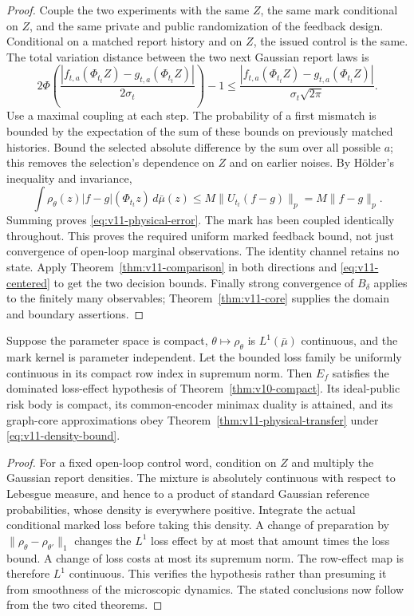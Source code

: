\begin{proof}
Couple the two experiments with the same $Z$, the same mark conditional
on $Z$, and the same private and public randomization of the feedback
design. Conditional on a matched report history and on $Z$, the issued
control is the same. The total variation distance between the two next
Gaussian report laws is
\[
 2\Phi\!\left(\frac{|f_{t,a}(\Phi_{t_t}Z)
                       -g_{t,a}(\Phi_{t_t}Z)|}{2\sigma_t}\right)-1
 \le \frac{|f_{t,a}(\Phi_{t_t}Z)
                       -g_{t,a}(\Phi_{t_t}Z)|}{\sigma_t\sqrt{2\pi}}.
\]
Use a maximal coupling at each step. The probability of a first mismatch
is bounded by the expectation of the sum of these bounds on previously
matched histories. Bound the selected absolute difference by the sum
over all possible $a$; this removes the selection's dependence on $Z$
and on earlier noises. By H\"older's inequality and invariance,
\[
 \int \rho_\theta(z)|f-g|(\Phi_{t_t}z)\,d\bar\mu(z)
 \le M\|U_{t_t}(f-g)\|_p=M\|f-g\|_p.
\]
Summing proves \eqref{eq:v11-physical-error}. The mark has been coupled
identically throughout. This proves the required uniform marked feedback
bound, not just convergence of open-loop marginal observations.
The identity channel retains no state. Apply
Theorem~\ref{thm:v11-comparison} in both directions and
\eqref{eq:v11-centered} to get the two decision bounds. Finally strong
convergence of $B_\delta$ applies to the finitely many observables;
Theorem~\ref{thm:v11-core} supplies the domain and boundary assertions.
\end{proof}

\begin{corollary}
\label{cor:v11-physical-duality}
Suppose the parameter space is compact, $\theta\mapsto\rho_\theta$ is
$L^1(\bar\mu)$ continuous, and the mark kernel is parameter independent.
Let the bounded loss family be uniformly continuous in its compact row
index in supremum norm. Then $E_f$ satisfies the dominated loss-effect
hypothesis of Theorem~\ref{thm:v10-compact}. Its ideal-public risk body
is compact, its common-encoder minimax duality is attained, and its
graph-core approximations obey Theorem~\ref{thm:v11-physical-transfer}
under \eqref{eq:v11-density-bound}.
\end{corollary}

\begin{proof}
For a fixed open-loop control word, condition on $Z$ and multiply the
Gaussian report densities. The mixture is absolutely continuous with
respect to Lebesgue measure, and hence to a product of standard Gaussian
reference probabilities, whose density is everywhere positive. Integrate
the actual conditional marked loss before taking this density. A change
of preparation by $\|\rho_\theta-\rho_{\theta'}\|_1$ changes the
$L^1$ loss effect by at most that amount times the loss bound. A change
of loss costs at most its supremum norm. The row-effect map is therefore
$L^1$ continuous. This verifies the hypothesis rather than presuming it
from smoothness of the microscopic dynamics. The stated conclusions now
follow from the two cited theorems.
\end{proof}


